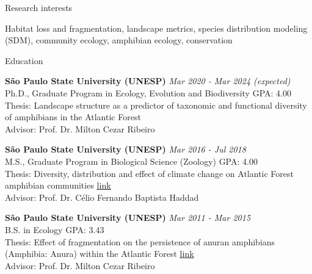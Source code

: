 \documentclass{resume}
\begin{document}
\begin{rSection}{Research interests}

Habitat loss and fragmentation, landscape metrics, species distribution modeling (SDM), community ecology, amphibian ecology, conservation

\end{rSection}


\begin{rSection}{Education}

{\bf São Paulo State University (UNESP)} \hfill {\em Mar 2020 - Mar 2024 (expected)} 
\\ Ph.D., Graduate Program in Ecology, Evolution and Biodiversity \hfill { GPA: 4.00 } 
\\ Thesis: Landscape structure as a predictor of taxonomic and functional diversity of amphibians in the Atlantic Forest \\ Advisor: Prof. Dr. Milton Cezar Ribeiro

{\bf São Paulo State University (UNESP)} \hfill {\em Mar 2016 - Jul 2018} 
\\ M.S., Graduate Program in Biological Science (Zoology)\hfill { GPA: 4.00 } 
\\ Thesis: Diversity, distribution and effect of climate change on Atlantic Forest amphibian communities \href{https://repositorio.unesp.br/handle/11449/154993}{\underline{link}} 
\\ Advisor: Prof. Dr. Célio Fernando Baptista Haddad

{\bf São Paulo State University (UNESP)} \hfill {\em Mar 2011 - Mar 2015} 
\\ B.S. in Ecology\hfill { GPA: 3.43 } 
\\ Thesis: Effect of fragmentation on the persistence of anuran amphibians (Amphibia: Anura) within the Atlantic Forest \href{https://repositorio.unesp.br/handle/11449/138991}{\underline{link}} 
\\ Advisor: Prof. Dr. Milton Cezar Ribeiro

\end{rSection}

\end{document}
